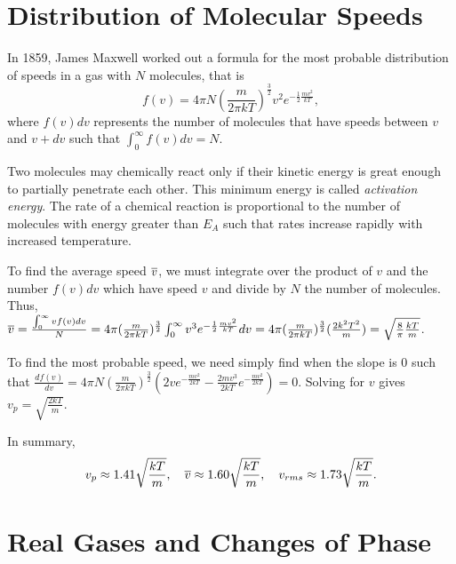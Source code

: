 \section{Distribution of Molecular Speeds}

\begin{definition}
    In 1859, James Maxwell worked out a formula for the most probable distribution of speeds in a gas with $N$ molecules, that is $$f(v) = 4\pi N(\frac{m}{2\pi kT})^{\frac{3}{2}}v^2e^{-\frac{1}{2}\frac{mv^2}{kT}},$$ where $f(v)dv$ represents the number of molecules that have speeds between $v$ and $v+dv$ such that $\int_0^\infty f(v)dv = N$.
\end{definition}
\begin{definition}
    Two molecules may chemically react only if their kinetic energy is great enough to partially penetrate each other. This minimum energy is called \emph{activation energy}. The rate of a chemical reaction is proportional to the number of molecules with energy greater than $E_A$ such that rates increase rapidly with increased temperature.
\end{definition}
\begin{example}
    To find the average speed $\overline{v}$, we must integrate over the product of $v$ and the number $f(v)dv$ which have speed $v$ and divide by $N$ the number of molecules. Thus, $\overline{v} = \frac{\int_0^\infty vf(v)dv}{N} = 4\pi(\frac{m}{2\pi k T})^\frac{3}{2} \int_0^\infty v^3 e^{-\frac{1}{2}\frac{mv^2}{kT}}dv = 4\pi(\frac{m}{2\pi k T})^\frac{3}{2} (\frac{2k^2 T^2}{m}) = \sqrt{\frac{8}{\pi}\frac{kT}{m}}$.

    To find the most probable speed, we need simply find when the slope is $0$ such that $\frac{df(v)}{dv} = 4\pi N(\frac{m}{2\pi k T})^\frac{3}{2}(2ve^{-\frac{mv^2}{2kT}} - \frac{2mv^3}{2kT}e^{-\frac{mv^2}{2kT}})=0$. Solving for $v$ gives $v_p = \sqrt{\frac{2kT}{m}}$.
\end{example}
\begin{note}
    In summary, $$v_p \approx 1.41 \sqrt{\frac{kT}{m}}, \quad \overline{v} \approx 1.60 \sqrt{\frac{kT}{m}}, \quad v_{rms} \approx 1.73 \sqrt{\frac{kT}{m}}.$$
\end{note}

\section{Real Gases and Changes of Phase}

